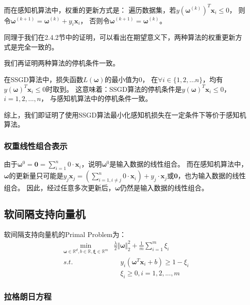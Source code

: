 \documentclass[12pt, a4paper]{article}
\newcommand{\ivec}{\bm}
\newcommand{\omegav}{\ivec{\omega}}
\newcommand{\xiv}{\ivec{\xi}}
\newcommand{\xv}{\ivec{x}}
\begin{document}
        而在感知机算法中，权重的更新方式是：
        遍历数据集，若$y (\omegav^{(k)})^T \xv_i \le 0$，
        则令$\omegav^{(k + 1)} = \omegav^{(k)} + y_i \xv_i$，
        否则令$\omegav^{(k + 1)} = \omegav^{(k)}$。

        同理于我们在2.4.2节中的证明，可以看出在期望意义下，两种算法的权重更新方式是完全一致的。

        我们再证明两种算法的停机条件一致。

        在SSGD算法中，损失函数$L(\omegav)$的最小值为0，
        在$\forall i \in \{1, 2, ...n\}$，均有$y (\omegav)^T \xv_i \le 0$时取到。
        这意味着：SSGD算法的停机条件是$y (\omegav)^T \xv_i \le 0$，$i = 1, 2, ..., n$，
        与感知机算法中的停机条件一致。

        综上，我们即证明了使用SSGD算法最小化感知机损失在一定条件下等价于感知机算法。

    \subsubsection{权重线性组合表示}

        由于$\omegav^{0} = \ivec{0} = \sum_{i = 1}^{n} 0 · \xv_i$，说明$\omegav^{0}$是输入数据的线性组合。
        而在感知机算法中，$\omegav$的更新量只可能是$y_j \xv_j = (\sum_{i = 1, i \ne j}^{n} 0 · \xv_i) + y_j · \xv_j$或$\ivec{0}$，也为输入数据的线性组合。
        因此，经过任意多次更新后，$\omegav$仍然是输入数据的线性组合。

    \subsection{软间隔支持向量机}

    软间隔支持向量机的Primal Problem为：
    \begin{equation}\begin{aligned}
    \min\limits_{\omegav \in \mathbb{R}^d, b \in \mathbb{R}, \xiv \in \mathbb{R}^m}& \frac{\lambda}{2} \Vert \omegav \Vert_2^2 + \frac{1}{m} \sum_{i = 1}^{m} \xi_i \\
    s.t.& \quad y_i (\omegav^T \xv_i + b) \ge 1 - \xi_i \\
        & \quad \xi_i \ge 0, i = 1, 2, ..., m
    \end{aligned}\end{equation}

    \subsubsection{拉格朗日方程}
\end{document}
